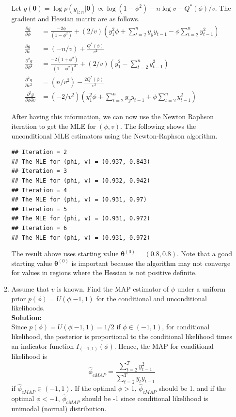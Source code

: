 \documentclass[12pt]{article}\usepackage[]{graphicx}\usepackage[]{color}
\makeatletter
\newenvironment{kframe}{%
 \def\at@end@of@kframe{}%
 \ifinner\ifhmode%
  \def\at@end@of@kframe{\end{minipage}}%
  \begin{minipage}{\columnwidth}%
 \fi\fi%
 \def\FrameCommand##1{\hskip\@totalleftmargin \hskip-\fboxsep
 \colorbox{shadecolor}{##1}\hskip-\fboxsep
     \hskip-\linewidth \hskip-\@totalleftmargin \hskip\columnwidth}%
 \MakeFramed {\advance\hsize-\width
   \@totalleftmargin\z@ \linewidth\hsize
   \@setminipage}}%
 {\par\unskip\endMakeFramed%
 \at@end@of@kframe}
\newenvironment{knitrout}{}{} %
\newcommand{\bstheta}{\boldsymbol{\theta}}
\makeatother
\begin{document}
\begin{enumerate}
\begin{enumerate}
	Let $g(\bstheta) = \log p(y_{1:n}|\bstheta) \propto \log(1-\phi^2) - n \log v - Q^*(\phi)/v$. The gradient and Hessian matrix are as follows.
	\begin{align*}
		\frac{\partial g}{\partial \phi} &= \frac{-2\phi}{(1-\phi^2)} + (2/v)\left(y_1^2\phi +\sum_{t=2}^n y_yy_{t-1} - \phi \sum_{t=2}^n y_{t-1}^2\right)\\
		\frac{\partial g}{\partial v} &= (-n/v) + \frac{Q^*(\phi)}{v^2}\\
		\frac{\partial ^2 g}{\partial \phi^2} &= \frac{-2(1+\phi ^2)}{(1-\phi ^2)^2} + (2/v)\left(y_1^2 - \sum_{t=2}^n y_{t-1}^2\right)\\
		\frac{\partial ^2 g}{\partial v^2} &= (n/v^2) - \frac{2Q^*(\phi)}{v^3}\\
		\frac{\partial ^2 g}{\partial \phi \partial v} &=(-2/v^2)\left(y_1^2\phi + \sum_{t=2}^n y_yy_{t-1} + \phi \sum_{t=2}^n y_{t-1}^2 \right)
	\end{align*}
	

	After having this information, we can now use the Newton Raphson iteration to get the MLE for $(\phi, v)$. The following shows the unconditional MLE estimators using the Newton-Raphson algorithm. 
\begin{knitrout}
\color{fgcolor}\begin{kframe}
\begin{verbatim}
## Iteration = 2
## The MLE for (phi, v) = (0.937, 0.843)
## Iteration = 3
## The MLE for (phi, v) = (0.932, 0.942)
## Iteration = 4
## The MLE for (phi, v) = (0.931, 0.97)
## Iteration = 5
## The MLE for (phi, v) = (0.931, 0.972)
## Iteration = 6
## The MLE for (phi, v) = (0.931, 0.972)
\end{verbatim}
\end{kframe}
\end{knitrout}
	The result above uses starting value $\bstheta^{(0)} = (0.8, 0.8)$. Note that a good starting value $\bstheta^{(0)}$ is important because the algorithm may not converge for values in regions where the Hessian is not positive definite.
	
	\item Assume that $v$ is known. Find the MAP estimator of $\phi$ under a uniform prior $p(\phi) = U(\phi|-1, 1)$ for the conditional and unconditional likelihoods.\\
	\textbf{Solution:}\\
	Since $p(\phi) = U(\phi|-1, 1) = 1/2$ if $\phi \in (-1, 1)$, for conditional likelihood, the posterior is proportional to the conditional likelihood times an indicator function $I_{(-1, 1)}(\phi)$. Hence, the MAP for conditional likelihood is 
	\begin{equation*}
		\hat{\phi}_{cMAP} = \frac{\sum_{t=2}^T y_{t-1}^2}{\sum_{t=2}^Ty_ty_{t-1}}
	\end{equation*}
	if $\hat{\phi}_{cMAP}\in (-1, 1)$. If the optimal $\phi > 1$, $\hat{\phi}_{cMAP}$ should be 1, and if the optimal $\phi < -1$, $\hat{\phi}_{cMAP}$ should be -1 since conditional likelihood is unimodal (normal) distribution.
	

\end{enumerate}
\end{enumerate}
\end{document}
